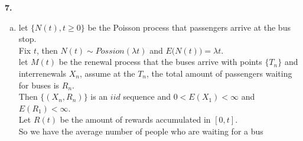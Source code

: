 \documentclass{amsart}
\theoremstyle{plain}
\theoremstyle{definition}
\begin{document}
\vspace{5mm}
\noindent \textbf{7.}
\begin{enumerate}[(a)]
	\item
	let $\{N(t), t\geq 0\}$ be the Poisson process that passengers arrive at the bus stop.\\
	Fix $t$, then $N(t) \sim Possion(\lambda t)$ and $E\big(N(t)\big) = \lambda t$.\\
	let $M(t)$ be the renewal process that the buses arrive with points $\{T_n\}$ and interrenewals $X_n$, assume at the $T_n$, the total amount of passengers waiting for buses is $R_n$. \\
	Then $\{(X_n,R_n)\}$ is an $iid$ sequence and $0<E(X_1) < \infty$ and $E(R_1) < \infty$.\\
	Let $R(t)$ be the amount of rewards accumulated in $[0,t]$.\\
	So we have the average number of people who are waiting for a bus


\end{enumerate}
\end{document}
